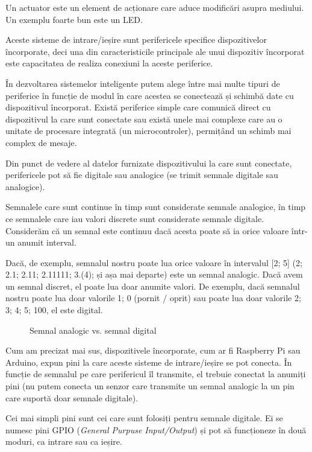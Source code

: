 Un actuator este un element de acționare care aduce modificări asupra mediului.
 Un exemplu foarte bun este un LED.

Aceste sisteme de intrare/ieșire sunt perifericele specifice dispozitivelor încorporate, deci una din caracteristicile principale ale unui dispozitiv încorporat este capacitatea de realiza conexiuni la aceste periferice.

În dezvoltarea sistemelor inteligente putem alege între mai multe tipuri de periferice în funcție de modul în care acestea se conectează și schimbă date cu dispozitivul încorporat.
Există periferice simple care comunică direct cu dispozitivul la care sunt conectate sau există unele mai complexe care au o unitate de procesare integrată (un microcontroler), permițând un schimb mai complex de mesaje.

Din punct de vedere al datelor furnizate dispozitivului la care sunt conectate, perifericele pot să fie digitale sau analogice (se trimit semnale digitale sau analogice).

Semnalele care sunt continue în timp sunt considerate semnale analogice, în timp ce semnalele care iau valori discrete sunt considerate semnale digitale.
 Considerăm că un semnal este continuu dacă acesta poate să ia orice valoare într-un anumit interval.

Dacă, de exemplu, semnalul nostru poate lua orice valoare în intervalul [2; 5] (2; 2.1; 2.11; 2.11111; 3.(4); și așa mai departe) este un semnal analogic.
Dacă avem un semnal discret, el poate lua doar anumite valori.
De exemplu, dacă semnalul nostru poate lua doar valorile {1; 0} (pornit / oprit) sau poate lua doar valorile {2; 3; 4; 5; 100}, el este digital.

\begin{figure}[htbp]
  \centering
  \def\svgwidth{\columnwidth}
  
  \caption{Semnal analogic vs. semnal digital}
  \label{fig:embed-analog-digital}
\end{figure}

Cum am precizat mai sus, dispozitivele încorporate, cum ar fi Raspberry Pi sau Arduino, expun pini la care aceste sisteme de intrare/ieșire se pot conecta.
În funcție de semnalul pe care perifericul îl transmite, el trebuie conectat la anumiți pini (nu putem conecta un senzor care transmite un semnal analogic la un pin care suportă doar semnale digitale).

Cei mai simpli pini sunt cei care sunt folosiți pentru semnale digitale.
Ei se numesc pini GPIO (\textit{General Purpuse Input/Output}) și pot să funcționeze în două moduri, ca intrare sau ca ieșire.


